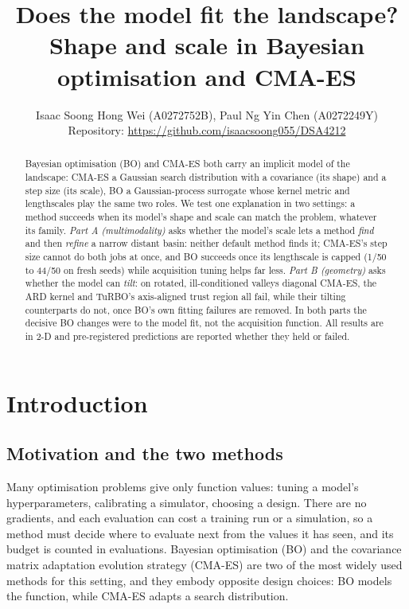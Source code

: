 \documentclass[10pt,a4paper]{article}
\title{\vspace{-1.3cm}Does the model fit the landscape?\\
Shape and scale in Bayesian optimisation and CMA-ES\vspace{-0.3cm}}
\author{Isaac Soong Hong Wei (A0272752B), Paul Ng Yin Chen (A0272249Y)\\[2pt]
\small Repository: \url{https://github.com/isaacsoong055/DSA4212}}
\date{\vspace{-0.7cm}}
\begin{document}
\maketitle

\begin{abstract}
\noindent
Bayesian optimisation (BO) and CMA-ES both carry an implicit model of the landscape: CMA-ES a Gaussian
search distribution with a covariance (its shape) and a step size (its scale), BO a Gaussian-process
surrogate whose kernel metric and lengthscales play the same two roles. We test one explanation in two
settings: a method succeeds when its model's shape and scale can match the problem, whatever its family.
\emph{Part A (multimodality)} asks
whether the model's scale lets a method \emph{find} and then \emph{refine} a narrow distant basin: neither
default method finds it; CMA-ES's step size cannot do both jobs at once, and BO succeeds once its lengthscale
is capped (1/50 to 44/50 on fresh seeds) while acquisition tuning helps far less. \emph{Part B (geometry)}
asks whether the model can \emph{tilt}: on rotated, ill-conditioned valleys diagonal CMA-ES, the ARD kernel
and TuRBO's axis-aligned trust region all fail, while their tilting counterparts do not, once BO's own fitting
failures are removed. In both parts the decisive
BO changes were to the model fit, not the acquisition function. All results are in 2-D and pre-registered
predictions are reported whether they held or failed.
\end{abstract}

\section{Introduction}
\subsection{Motivation and the two methods}
Many optimisation problems give only function values: tuning a model's hyperparameters, calibrating a
simulator, choosing a design. There are no gradients, and each evaluation can cost a training run or a
simulation, so a method must decide where to evaluate next from the values it has seen, and its budget is
counted in evaluations. Bayesian optimisation (BO) and the covariance matrix adaptation evolution strategy
(CMA-ES) are two of the most widely used methods for this setting, and they embody opposite design choices:
BO models the function, while CMA-ES adapts a search distribution.
\end{document}
